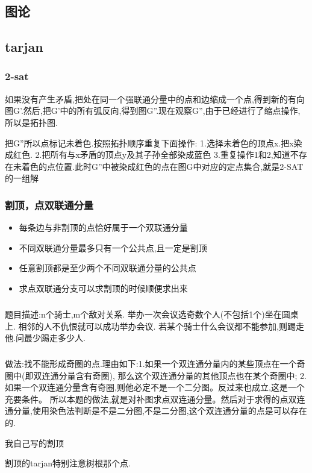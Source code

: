 \documentclass[landscape]{report}
\newcommand{\includecode}[2][c]{}
\begin{document}
\begin{flushleft}
\begin{multicols}{2}
\includecode[c++]{cash.cpp}
\chapter{ 图论}
\section{ tarjan }
\subsection{ 2-sat}
如果没有产生矛盾,把处在同一个强联通分量中的点和边缩成一个点,得到新的有向图G'.然后,把G'中的所有弧反向,得到图G''.现在观察G'',由于已经进行了缩点操作,所以是拓扑图.

把G''所以点标记未着色.按照拓扑顺序重复下面操作:
1.选择未着色的顶点x.把x染成红色.
2.把所有与x矛盾的顶点y及其子孙全部染成蓝色
3.重复操作1和2,知道不存在未着色的点位置.此时G''中被染成红色的点在图G中对应的定点集合,就是2-SAT的一组解
\includecode[c++]{cf568C.cpp}
\subsection{ 割顶，点双联通分量}
\begin{itemize}
\item 每条边与非割顶的点恰好属于一个双联通分量
\item 不同双联通分量最多只有一个公共点,且一定是割顶
\item 任意割顶都是至少两个不同双联通分量的公共点
\item 求点双联通分支可以求割顶的时候顺便求出来
\end{itemize}
\paragraph*{ }
题目描述:n个骑士,m个敌对关系. 举办一次会议选奇数个人(不包括1个)坐在圆桌上. 相邻的人不仇恨就可以成功举办会议. 若某个骑士什么会议都不能参加,则踢走他.问最少踢走多少人.
\paragraph{ }
做法:找不能形成奇圈的点.理由如下:1.如果一个双连通分量内的某些顶点在一个奇圈中(即双连通分量含有奇圈),
那么这个双连通分量的其他顶点也在某个奇圈中; 2. 如果一个双连通分量含有奇圈,则他必定不是一个二分图。反过来也成立,这是一个充要条件。 所以本题的做法,就是对补图求点双连通分量。然后对于求得的点双连通分量,使用染色法判断是不是二分图,不是二分图,这个双连通分量的点是可以存在的.
\includecode[c++]{poj2942.cpp}
我自己写的割顶
\includecode[c++]{poj2942my.cpp}
割顶的tarjan特别注意树根那个点.
\includecode[c++]{tarjan.cpp}

\end{multicols}
\end{flushleft}
\end{document}
